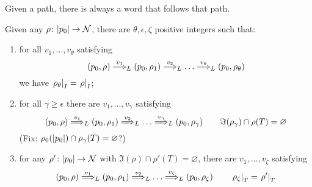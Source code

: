\begin{lemma}
Given a path, there is always a word that follows that path.
\end{lemma}

\begin{lemma} Given any $\rho \colon |p_0| \to \mathcal{N}$, there are $\theta,\epsilon,\zeta$ positive integers such that:
\label{lem:IT}
\begin{enumerate}

\item
for all $v_1,\dots,v_\theta$ satisfying
\[
	(p_0,\rho) \overset{v_1}{\Longrightarrow}_{L} (p_0,\rho_1) \overset{v_2}{\Longrightarrow}_{L} \dots \overset{v_{\theta}}{\Longrightarrow}_{L} (p_0,\rho_\theta)
\]
we have $\left. \rho_\theta \right|_{I} = \left. \rho \right|_{I}$;
\label{idI}

\item %
for all $\gamma \geq \epsilon$ there are $v_1,\dots,v_\gamma$ satisfying
\[
	(p_0,\rho) \overset{v_1}{\Longrightarrow}_{L} (p_0,\rho_1) \overset{v_2}{\Longrightarrow}_{L} \dots \overset{v_\gamma}{\Longrightarrow}_{L} (p_0,\rho_\gamma)
	\qquad 
	\Im(\rho_\gamma) \cap \rho(T) = \varnothing
\]
(Fix: $\rho_0(|p_0|) \cap \rho_\gamma(T) = \varnothing$?)
\label{forgetT}
\item
for any $\rho' \colon |p_0| \to \mathcal{N}$ with $\Im(\rho) \cap \rho'(T) = \varnothing$, there are $v_1,\dots,v_\zeta$ satisfying
\[
	(p_0,\rho) \overset{v_1}{\Longrightarrow}_{L} (p_0,\rho_1) \overset{v_2}{\Longrightarrow}_{L} \dots \overset{v_\zeta}{\Longrightarrow}_{L} (p_0,\rho_\zeta)	
	\qquad
	\left.\rho_\zeta\right|_{T} = \left.\rho'\right|_{T}
\]
\label{initT}
\end{enumerate}
\end{lemma}
